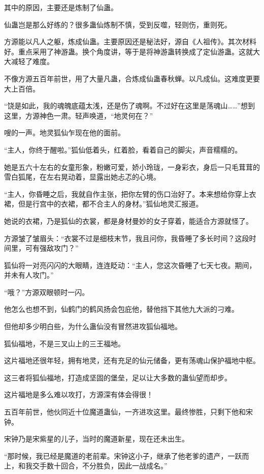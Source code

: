 \begin{this_body}
其中的原因，主要还是炼制了仙蛊。

仙蛊岂是那么好练的？很多蛊仙炼制不慎，受到反噬，轻则伤，重则死。

方源能以凡人之躯，炼成仙蛊。主要原因还是秘法好，源自《人祖传》。其次材料好。重点采用了神游蛊。换个角度讲，等于是将神游蛊转换成了定仙游蛊。这就大大减轻了难度。

不像方源五百年前世，用了大量凡蛊，合炼成仙蛊春秋蝉。以凡成仙。这难度更要大上百倍。

“饶是如此，我的魂魄底蕴太浅，还是伤了魂啊。不过好在这里是荡魂山……”想到这里，方源神色一肃。轻声唤道，“地灵何在？”

嗖的一声。地灵狐仙乍现在他的面前。

“主人，你终于醒啦。”狐仙低着头，红着脸，看着自己的脚尖，声音糯糯的。

她是五六十左右的女童形象，粉嫩可爱，娇小玲珑，一身彩衣，身后一只毛茸茸的雪白狐尾，在左右晃动着，显露出她忐忑的心境。

“主人，你昏睡之后，我就自作主张，把你左臂的伤口治好了。本来想给你穿上衣裙，但是行宫中的衣裙，都不合主人的身材。”狐仙地灵汇报道。

她说的衣裙，乃是狐仙的衣裳，都是身材曼妙的女子穿着，能适合方源就怪了。

方源皱了皱眉头：“衣裳不过是细枝末节，我且问你，我昏睡了多长时间？这段时间里，可有强敌攻门？”

狐仙将一对亮闪闪的大眼睛，连连眨动：“主人，您这次昏睡了七天七夜。期间，并未有人攻门。”

“哦？”方源双眼顿时一闪。

他怎么也想不到，仙鹤门的鹤风扬会包庇他，替他挡下其他九大派的刁难。

但他却多少明白些，为什么蛊仙没有冒然进攻狐仙福地。

狐仙福地，不是三叉山上的三王福地。

这片福地还很年轻，拥有地灵，还有充足的仙元储备，更有荡魂山保护福地中枢。

这三者将狐仙福地，打造成坚固的堡垒，足以让大多数的蛊仙望而却步。

这片福地是多么难以攻打，方源深有体会得很！

五百年前世，他伙同近十位魔道蛊仙，一齐进攻这里。最终惨胜，只剩下他和宋钟。

宋钟乃是宋紫星的儿子，当时的魔道新星，现在还未出生。

“那时候，我已经是魔道的老前辈。宋钟这小子，继承了他老爹的遗产，一跃而上，和我交手数十回合，不分胜负，因此一战成名。”


\end{this_body}
